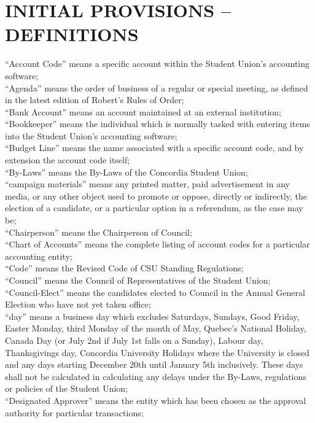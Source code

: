 \documentclass[oneside]{book}
\begin{document}
\part{\label{DEFINITIONS}INITIAL PROVISIONS -- DEFINITIONS}
``Account Code'' means a specific account within the Student Union’s accounting software; \\
``Agenda'' means the order of business of a regular
or special meeting, as defined in the latest edition of Robert's Rules
of Order; \\
``Bank Account'' means an account maintained at an external institution; \\
``Bookkeeper'' means the individual which is normally tasked with entering items into the Student Union’s accounting software; \\
``Budget Line'' means the name associated with a specific account code, and by extension the account code itself; \\
 ``By-Laws'' means the By-Laws of the Concordia
Student Union; \\
``campaign materials'' means any printed
matter, paid advertisement in any media, or any other object used
to promote or oppose, directly or indirectly, the election of a candidate,
or a particular option in a referendum, as the case may be; \\
``Chairperson'' means the Chairperson of
Council; \\
``Chart of Accounts'' means the complete listing of account codes for a particular accounting entity; \\
``Code'' means the Revised Code of CSU Standing
Regulations; \\
``Council'' means the Council of Representatives
of the Student Union; \\
``Council-Elect'' means the candidates elected
to Council in the Annual General Election who have not yet taken office;\\
``day'' means a business day which excludes
Saturdays, Sundays, Good Friday, Easter Monday, third Monday of the
month of May, Quebec's National Holiday, Canada Day (or July 2nd if
July 1st falls on a Sunday), Labour day, Thanksgivings day, Concordia
University Holidays where the University is closed and any days starting
December 20th until January 5th inclusively. These days shall not
be calculated in calculating any delays under the By-Laws, regulations
or policies of the Student Union; \\
``Designated Approver'' means the entity which has been chosen as the approval authority for particular transactions; \\
\end{document}
